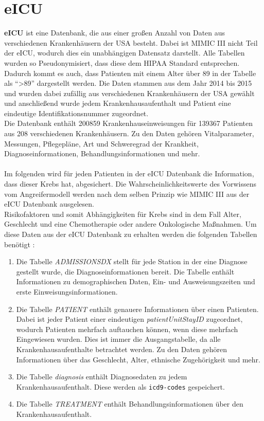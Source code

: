 \documentclass[german,version-2020-11]{uzl-thesis}
\begin{document}
\section{eICU}
\textbf{eICU} ist eine Datenbank, die aus einer großen Anzahl von Daten aus verschiedenen Krankenhäusern der USA besteht. Dabei ist MIMIC III nicht Teil der eICU, wodurch dies ein unabhängigen Datensatz darstellt. Alle Tabellen wurden so Pseudonymisiert, dass diese dem HIPAA Standard entsprechen. Dadurch kommt es auch, dass Patienten mit einem Alter über 89 in der Tabelle als \enquote{>89} dargestellt werden. Die Daten stammen aus dem Jahr 2014 bis 2015 und wurden dabei zufällig aus verschiedenen Krankenhäusern der USA gewählt und anschließend wurde jedem Krankenhausaufenthalt und Patient eine eindeutige Identifikationsnummer zugeordnet. \\ 
Die Datenbank enthält 200859 Krankenhauseinweisungen für 139367 Patienten aus 208 verschiedenen Krankenhäusern. Zu den Daten gehören Vitalparameter, Messungen, Pflegepläne, Art und Schweregrad der Krankheit, Diagnoseinformationen, Behandlungsinformationen und mehr. \\ \\
Im folgenden wird für jeden Patienten in der eICU Datenbank die Information, dass dieser Krebs hat, abgesichert. Die Wahrscheinlichkeitswerte des Vorwissens vom Angreifermodell werden nach dem selben Prinzip wie MIMIC III aus der eICU Datenbank ausgelesen. \\ 
Risikofaktoren und somit Abhängigkeiten für Krebs sind in dem Fall Alter, Geschlecht und eine Chemotherapie oder andere Onkologische Maßnahmen\cite{13,14}. Um diese Daten aus der eICU Datenbank zu erhalten werden die folgenden Tabellen benötigt : 
\begin{enumerate}
	\item Die Tabelle \textit{ADMISSIONSDX} stellt für jede Station in der eine Diagnose gestellt wurde, die Diagnoseinformationen bereit. Die Tabelle enthält Informationen zu demographischen Daten, Ein- und Ausweisungszeiten und erste Einweisungsinformationen.
	\item Die Tabelle \textit{PATIENT} enthält genauere Informationen über einen Patienten.  Dabei ist jeder Patient einer eindeutigen \textit{patientUnitStayID} zugeordnet, wodurch Patienten mehrfach auftauchen können, wenn diese mehrfach Eingewiesen wurden. Dies ist immer die Ausgangstabelle, da alle Krankenhausaufenthalte betrachtet werden. Zu den Daten gehören Informationen über das Geschlecht, Alter, ethnische Zugehörigkeit und mehr.
	\item Die Tabelle \textit{diagnosis} enthält Diagnosedaten zu jedem Krankenhausaufenthalt. Diese werden als \texttt{icd9-codes} gespeichert.
	\item Die Tabelle \textit{TREATMENT } enthält Behandlungsinformationen über den Krankenhausaufenthalt.
\end{enumerate} 
\end{document}
